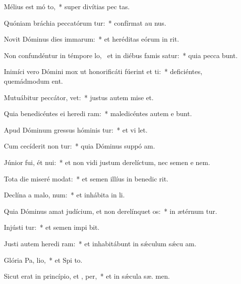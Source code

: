 \item Mélius est mó to,~* super divítias pec tas.
\item Quóniam bráchia peccatórum tur:~* confírmat au  nus.
\item Novit Dóminus dies immarum:~* et heréditas eórum in  rit.
\item Non confundéntur in témpore lo,~\pscross{} et in diébus famis satur:~* quia pecca bunt.
\item Inimíci vero Dómini mox ut honorificáti fúerint et ti:~* deficiéntes, quemádmodum  ent.
\item Mutuábitur peccátor,   vet:~* justus autem mise  et.
\item Quia benedicéntes ei heredi ram:~* maledicéntes autem e bunt.
\item Apud Dóminum gressus hóminis tur:~* et vi  let.
\item Cum cecíderit non tur:~* quia Dóminus suppó  am.
\item Júnior fui, ét nui:~* et non vidi justum derelíctum, nec semen e  nem.
\item Tota die miseré  modat:~* et semen illíus in benedic rit.
\item Declína a malo,   num:~* et inhábita in  li.
\item Quia Dóminus amat judícium, et non derelínquet  os:~* in ætérnum tur.
\item Injústi tur:~* et semen impi bit.
\item Justi autem heredi ram:~* et inhabitábunt in sǽculum sǽcu  am.
\item Glória Pa,  lio,~* et Spi to.
\item Sicut erat in princípio, et ,  per,~* et in sǽcula sæ. men.
